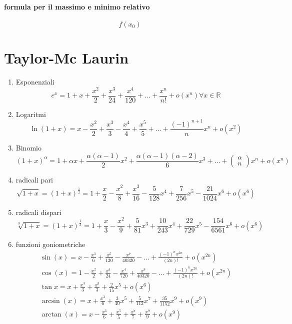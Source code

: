\documentclass{article}
\begin{document}
\paragraph{formula per il massimo e minimo relativo}
\begin{equation}
	f(x_0)
\end{equation}
\section{Taylor-Mc Laurin}
\begin{enumerate}
\item Esponenziali
\begin{equation*}
	e^x=1+x+\frac{x^2}{2}+\frac{x^3}{24}+\frac{x^4}{120}+\dots+\frac{x^n}{n!}+o(x^n) \forall x\in \mathds{R}
\end{equation*}
\item Logaritmi
\begin{equation*}
	\ln(1+x)=x-\frac{x^2}{2}+\frac{x^3}{3}-\frac{x^4}{4}+\frac{x^5}{5}+\dots+\frac{(-1)^{n+1}}{n}x^n+o(x^2)
\end{equation*}
\item Binomio 
\begin{equation*}
	(1+x)^\alpha=1+\alpha x+\frac{\alpha(\alpha-1)}{2}x^2+\frac{\alpha(\alpha-1)(\alpha-2)}{6}x^3+\dots+\begin{pmatrix}\alpha\\ n\end{pmatrix}x^n+o(x^n)
\end{equation*}
\item radicali pari
\begin{equation*}
	\sqrt{1+x}=\left(1+x\right)^\frac{1}{2}=1+\frac{x}{2}-\frac{x^2}{8}+\frac{x^3}{16}-\frac{5}{128}x^4+\frac{7}{256}x^5-\frac{21}{1024}x^6+o(x^6)
\end{equation*}
\item radicali dispari
\begin{equation*}
	\sqrt[3]{1+x}=(1+x)^\frac{1}{3}=1+\frac{x}{3}-\frac{x^2}{9}+\frac{5}{81}x^3+\frac{10}{243}x^4+\frac{22}{729}x^5-\frac{154}{6561}x^6+o(x^6)
\end{equation*}
\item funzioni goniometriche
\begin{eqnarray*}
	\sin(x)=x-\frac{x^3}{6}+\frac{x^5}{120}-\frac{x^7}{40320}-\dots+\frac{(-1)^nx^{2n}}{(2n)!}+o(x^{2n})\\
	\cos(x)=1-\frac{x^{2}}{2}+\frac{x^4}{24}-\frac{x^4}{720}+\frac{x^8}{40320}-\dots+\frac{(-1)^nx^{2n}}{(2n)!}+o(x^{2n})\\
	\tan x=x+\frac{x^3}{3}+\frac{x^3}{3}+\frac{2}{15}x^5+o(x^6)\\
	\arcsin(x)=x+\frac{x^3}{6}+\frac{3}{40}x^5+\frac{5}{112}x^7+\frac{35}{1152}x^9+o(x^9)\\
	\arctan(x)=x-\frac{x^3}{6}+\frac{x^5}{5}+\frac{x^7}{7}+\frac{x^9}{9}+o(x^9)
\end{eqnarray*}
\end{enumerate}
\end{document}
